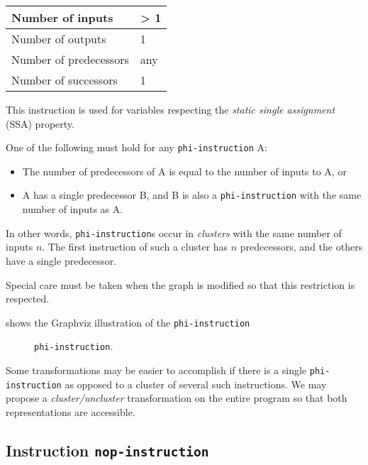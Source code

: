 \begin{tabular}{|l|l|}
\hline
Number of inputs & > 1\\
\hline
Number of outputs & 1\\
\hline
Number of predecessors & any\\
\hline
Number of successors & 1\\
\hline
\end{tabular}

This instruction is used for variables respecting the \emph{static
  single assignment} (SSA) property.  

One of the following must hold for any \texttt{phi-instruction} A:

\begin{itemize}
\item The number of predecessors of A is equal to the number of inputs
  to A, or
\item A has a single predecessor B, and B is also a
  \texttt{phi-instruction} with the same number of inputs as A.
\end{itemize}

In other words, \texttt{phi-instruction}s occur in \emph{clusters}
with the same number of inputs $n$.  The first instruction of such a
cluster has $n$ predecessors, and the others have a single
predecessor. 

Special care must be taken when the graph is modified so that this
restriction is respected. 

 shows the Graphviz illustration of the
\texttt{phi-instruction}

\begin{figure}
\begin{center}
\end{center}
\caption{\label{fig-phi-instruction}
\texttt{phi-instruction}.}
\end{figure}

Some transformations may be easier to accomplish if there is a single
\texttt{phi-instruction} as opposed to a cluster of several such
instructions.  We may propose a \emph{cluster/uncluster}
transformation on the entire program so that both representations are
accessible. 

\subsection{Instruction \texttt{nop-instruction}}
\label{mir-instruction-nop}


